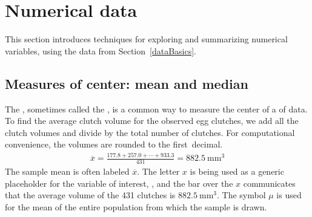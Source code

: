 \section[Numerical data]{Numerical data}
\label{numericalData}


This section introduces techniques for exploring and summarizing numerical variables, using the  data from Section~\ref{dataBasics}.

\subsection{Measures of center: mean and median}
\label{measuresOfCenter}

The , sometimes called the , is a common way to measure the center of a  of data. To find the average clutch volume for the observed egg clutches, we add all the clutch volumes and divide by the total number of clutches. For computational convenience, the volumes are rounded to the first~decimal.
\begin{eqnarray}
\overline{x} = \frac{177.8 + 257.0 + \cdots + 933.3}{431} = 882.5\ \textrm{mm}^{3}
\label{sampleMeanEquation}
\end{eqnarray}
The sample mean is often labeled $\overline{x}$. The letter $x$ is being used as a generic placeholder for the variable of interest, , and the bar over the $x$ communicates that the average volume of the 431 clutches is $882.5 \ \textrm{mm}^{3}$. The symbol $\mu$ is used for the mean of the entire population from which the sample is drawn.

